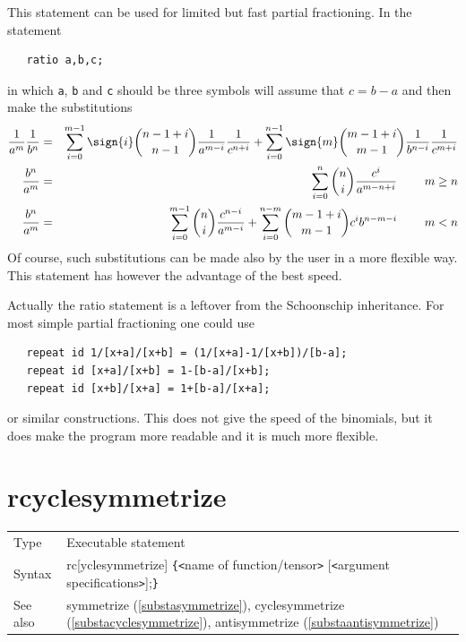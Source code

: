 \noindent This statement can be used for limited but fast 
partial fractioning. In the statement
\begin{verbatim}
   ratio a,b,c;
\end{verbatim}
in which \verb:a:, \verb:b: and \verb:c: should be three symbols {\FORM} 
will assume that $c = b-a$ and then make the substitutions
\begin{eqnarray}
    \frac{1}{a^m}\frac{1}{b^n} & = & \sum_{i=0}^{m-1}\sign{i}
        \binom{n-1+i}{n-1}\frac{1}{a^{m-i}}\frac{1}{c^{n+i}}
        +\sum_{i=0}^{n-1}\sign{m}
        \binom{m-1+i}{m-1}\frac{1}{b^{n-i}}\frac{1}{c^{m+i}}
        \nonumber \\
    \frac{b^n}{a^m} & = & \sum_{i=0}^n\binom{n}{i}\frac{c^i}{a^{m-n+i}}
            \ \ \ \ \ \ \ \hfill m\ge n \nonumber \\
    \frac{b^n}{a^m} & = & \sum_{i=0}^{m-1}\binom{n}{i}\frac{c^{n-i}}{a^{m-i}}
        + \sum_{i=0}^{n-m}\binom{m-1+i}{m-1}
            c^ib^{n-m-i}
            \ \ \ \ \ \ \ \hfill m<n \nonumber
\end{eqnarray}
Of course, such substitutions can be made also by the user in a more 
flexible way. This statement has however the advantage of the best speed.
\vspace{4mm}

\noindent Actually the ratio statement is a leftover from the 
Schoonschip 
inheritance. For most simple partial fractioning one could use
\begin{verbatim}
   repeat id 1/[x+a]/[x+b] = (1/[x+a]-1/[x+b])/[b-a];
   repeat id [x+a]/[x+b] = 1-[b-a]/[x+b];
   repeat id [x+b]/[x+a] = 1+[b-a]/[x+a];
\end{verbatim}
or similar constructions. This does not give the speed of the 
binomials, but it does make the program more readable and 
it is much more flexible.
\vspace{10mm}

 
\section{rcyclesymmetrize}
\label{substarcyclesymmetrize}

\noindent \begin{tabular}{ll}
Type & Executable statement\\
Syntax & rc[yclesymmetrize] \verb:{:{\tt<}name of function/tensor{\tt>}
         [{\tt<}argument specifications{\tt>}];\verb:}: \\
See also & symmetrize (\ref{substasymmetrize}), cyclesymmetrize 
(\ref{substacyclesymmetrize}), antisymmetrize (\ref{substaantisymmetrize})
\end{tabular} \vspace{4mm}


